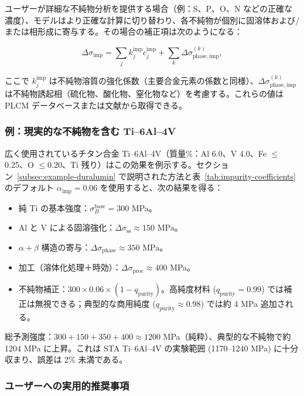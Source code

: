 \documentclass[11pt,a4paper]{article}
\theoremstyle{remark}
\begin{document}
	ユーザーが詳細な不純物分析を提供する場合（例：S、P、O、N などの正確な濃度）、モデルはより正確な計算に切り替わり、各不純物が個別に固溶体および/または相形成に寄与する。その場合の補正項は次のようになる：
	
	\[
	\Delta\sigma_{\mathrm{imp}} = \sum_{j} k_j^{\mathrm{imp}} c_j^{\mathrm{imp}} + \sum_{k} \Delta\sigma_{\mathrm{phase,imp}}^{(k)},
	\]
	
	ここで \(k_j^{\mathrm{imp}}\) は不純物溶質の強化係数（主要合金元素の係数と同様）、\(\Delta\sigma_{\mathrm{phase,imp}}^{(k)}\) は不純物誘起相（硫化物、酸化物、窒化物など）を考慮する。これらの値は PLCM データベースまたは文献から取得できる。
	
	\subsubsection*{例：現実的な不純物を含む Ti–6Al–4V}
	
	広く使用されているチタン合金 Ti–6Al–4V（質量\%：Al 6.0、V 4.0、Fe \(\le\)0.25、O \(\le\)0.20、Ti 残り）はこの効果を例示する。セクション~\ref{subsec:example-duralumin} で説明された方法と表~\ref{tab:impurity-coefficients} のデフォルト \(\alpha_{\mathrm{imp}}=0.06\) を使用すると、次の結果を得る：
	
	\begin{itemize}
		\item 純 Ti の基本強度：\(\sigma_B^{\mathrm{base}} = 300\) MPa。
		\item Al と V による固溶強化：\(\Delta\sigma_{\mathrm{ss}} \approx 150\) MPa。
		\item \(\alpha+\beta\) 構造の寄与：\(\Delta\sigma_{\mathrm{phase}} \approx 350\) MPa。
		\item 加工（溶体化処理＋時効）：\(\Delta\sigma_{\mathrm{proc}} \approx 400\) MPa。
		\item 不純物補正：\(300 \times 0.06 \times (1 - q_{\mathrm{purity}})\)。高純度材料 (\(q_{\mathrm{purity}}=0.99\)) では補正は無視できる；典型的な商用純度 (\(q_{\mathrm{purity}}\approx 0.98\)) では約 4 MPa 追加される。
	\end{itemize}
	
	総予測強度：\(300+150+350+400 \approx 1200\) MPa（純粋）、典型的な不純物で約 1204 MPa に上昇。これは STA Ti–6Al–4V の実験範囲 (1170–1240 MPa) に十分収まり、誤差は 2\% 未満である。
	
	\subsubsection*{ユーザーへの実用的推奨事項}
	
\end{document}
